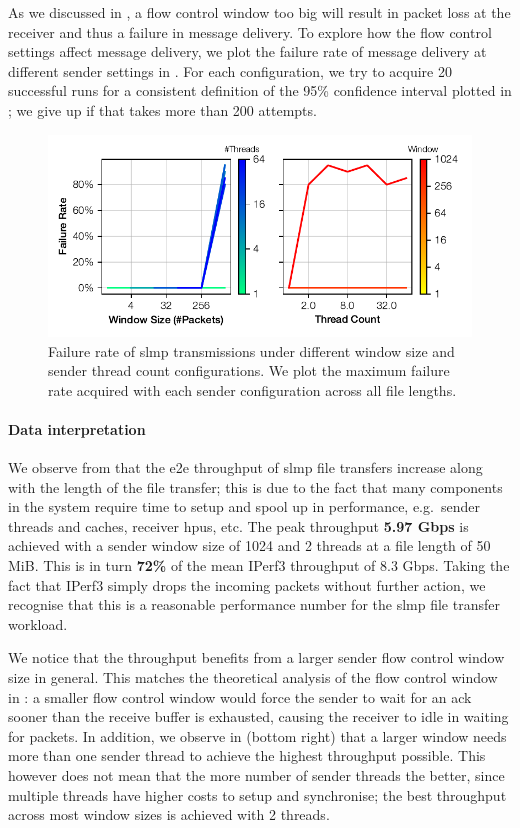 As we discussed in , a flow control window too big will result in packet loss at the receiver and thus a failure in message delivery.  To explore how the flow control settings affect message delivery, we plot the failure rate of message delivery at different sender settings in .  For each configuration, we try to acquire 20 successful runs for a consistent definition of the 95\% confidence interval plotted in ; we give up if that takes more than 200 attempts.

\begin{figure}[t]
    \centering
    \includegraphics{thesis/figures/slmp-loss.pdf}
    \caption{Failure rate of \ac{slmp} transmissions under different window size and sender thread count configurations.  We plot the maximum failure rate acquired with each sender configuration across all file lengths.} \label{fig:slmp-loss}
\end{figure}

\paragraph{Data interpretation} We observe from  that the \ac{e2e} throughput of \ac{slmp} file transfers increase along with the length of the file transfer; this is due to the fact that many components in the system require time to setup and spool up in performance, e.g.\ sender threads and caches, receiver \ac{hpu}s, etc.  The peak throughput \textbf{5.97 Gbps} is achieved with a sender window size of 1024 and 2 threads at a file length of 50 MiB.  This is in turn \textbf{72\%} of the mean IPerf3 throughput of 8.3 Gbps.  Taking the fact that IPerf3 simply drops the incoming packets without further action, we recognise that this is a reasonable performance number for the \ac{slmp} file transfer workload.

We notice that the throughput benefits from a larger sender flow control window size in general.  This matches the theoretical analysis of the flow control window in : a smaller flow control window would force the sender to wait for an \ac{ack} sooner than the receive buffer is exhausted, causing the receiver to idle in waiting for packets.  In addition, we observe in  (bottom right) that a larger window needs more than one sender thread to achieve the highest throughput possible.  This however does not mean that the more number of sender threads the better, since multiple threads have higher costs to setup and synchronise; the best throughput across most window sizes is achieved with 2 threads.

